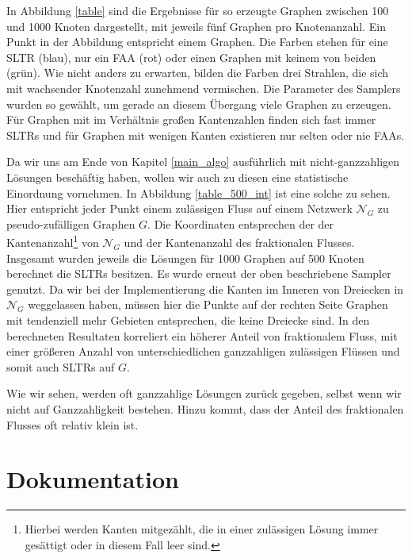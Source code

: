 In Abbildung \ref{table} sind die Ergebnisse für so erzeugte Graphen zwischen 100 und 1000 Knoten dargestellt, mit jeweils fünf Graphen pro Knotenanzahl. Ein Punkt in der Abbildung entspricht einem Graphen. Die Farben stehen für eine SLTR (blau), nur ein FAA (rot) oder einen Graphen mit keinem von beiden (grün). 
Wie nicht anders zu erwarten, bilden die Farben drei Strahlen, die sich mit wachsender Knotenzahl zunehmend vermischen. Die Parameter des Samplers wurden so gewählt, um gerade an diesem Übergang viele Graphen zu erzeugen. Für Graphen mit im Verhältnis großen Kantenzahlen finden sich fast immer SLTRs und für Graphen mit wenigen Kanten existieren nur selten oder nie FAAs.

Da wir uns am Ende von Kapitel \ref{main_algo} ausführlich mit nicht-ganzzahligen Lösungen beschäftig haben, wollen wir auch zu diesen eine statistische Einordnung vornehmen. In Abbildung \ref{table_500_int} ist eine solche zu sehen. Hier entspricht jeder Punkt einem zulässigen Fluss auf einem Netzwerk $\mathcal{N}_G$ zu pseudo-zufälligen Graphen $G$. Die Koordinaten entsprechen der der Kantenanzahl\footnote{Hierbei werden Kanten mitgezählt, die in einer zulässigen Lösung immer gesättigt oder in diesem Fall leer sind.} von $\mathcal{N}_G$ und der Kantenanzahl des fraktionalen Flusses. Insgesamt wurden jeweils die Lösungen für 1000 Graphen auf 500 Knoten berechnet die SLTRs besitzen. Es wurde erneut der oben beschriebene Sampler genutzt. Da wir bei der Implementierung die Kanten im Inneren von Dreiecken in$\mathcal{N}_G$ weggelassen haben, müssen hier die Punkte auf der rechten Seite Graphen mit tendenziell mehr Gebieten entsprechen, die keine Dreiecke sind. In den berechneten Resultaten korreliert ein höherer Anteil von fraktionalem Fluss, mit einer größeren Anzahl von unterschiedlichen ganzzahligen zulässigen Flüssen und somit auch SLTRs auf $G$.



Wie wir sehen, werden oft ganzzahlige Lösungen zurück gegeben, selbst wenn wir nicht auf Ganzzahligkeit bestehen. Hinzu kommt, dass der Anteil des fraktionalen Flusses oft relativ klein ist.

\section{Dokumentation}

